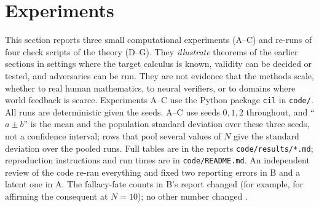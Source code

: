
\section{Experiments}\label{sec:experiments}

This section reports three small computational experiments (A--C) and re-runs of four check scripts of the theory (D--G). They \emph{illustrate} theorems of the earlier sections in settings where the target calculus is known, validity can be decided or tested, and adversaries can be run. They are not evidence that the methods scale, whether to real human mathematics, to neural verifiers, or to domains where world feedback is scarce. Experiments A--C use the Python package \texttt{cil} in \texttt{code/}. All runs are deterministic given the seeds. A--C use seeds $0,1,2$ throughout, and ``$a\pm b$'' is the mean and the population standard deviation over these three seeds, not a confidence interval; rows that pool several values of $N$ give the standard deviation over the pooled runs. Full tables are in the reports \texttt{code/results/*.md}; reproduction instructions and run times are in \texttt{code/README.md}. An independent review of the code re-ran everything and fixed two reporting errors in B and a latent one in A. The fallacy-fate counts in B's report changed (for example, for affirming the consequent at $N=10$); no other number changed .

